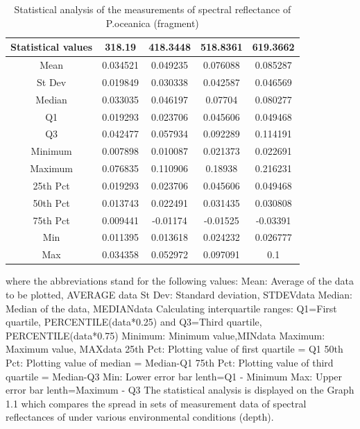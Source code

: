 \documentclass[10pt, a4paper]{article}
\begin{document}
\begin{table}
\caption{Statistical analysis of the measurements of spectral reflectance of P.oceanica (fragment)}
\centering
  \begin{tabular}{| c | c | c | c | c |}
    \hline
   	 \textbf{Statistical values} & \textbf{318.19} & \textbf{418.3448} & \textbf{518.8361} & \textbf{619.3662} \\ \hline \hline
	    Mean & 0.034521 & 0.049235 & 0.076088 & 0.085287 \\ \hline
	    St Dev & 0.019849 & 0.030338 & 0.042587 & 0.046569 \\ \hline
	   Median & 0.033035 & 0.046197 & 0.07704 & 0.080277 \\ \hline
	   Q1 & 0.019293 & 0.023706 & 0.045606& 0.049468 \\ \hline
	   Q3 & 0.042477 & 0.057934 & 0.092289 & 0.114191 \\ \hline
	   Minimum & 0.007898 & 0.010087 & 0.021373 & 0.022691 \\ \hline
	   Maximum & 0.076835 & 0.110906 & 0.18938 & 0.216231 \\ \hline
	   25th Pct & 0.019293 & 0.023706 & 0.045606 & 0.049468 \\ \hline
	   50th Pct & 0.013743 & 0.022491 & 0.031435 & 0.030808 \\ \hline
	   75th Pct & 0.009441 & -0.01174 & -0.01525 & -0.03391 \\ \hline
	   Min & 0.011395 & 0.013618 & 0.024232 & 0.026777 \\ \hline
	   Max & 0.034358 & 0.052972 & 0.097091 & 0.1 \\ \hline
  \end{tabular}
   \label{tab:4}
\end{table}

where the abbreviations stand for the following values:
Mean: Average of the data to be plotted, AVERAGE {data}
St Dev: Standard deviation, STDEV{data}
Median: Median of the data, MEDIAN{data}
Calculating interquartile ranges: Q1=First quartile, PERCENTILE({data}*0.25) and Q3=Third
quartile, PERCENTILE({data}*0.75)
Minimum: Minimum value,MIN{data}
Maximum: Maximum value, MAX{data}
25th Pct: Plotting value of first quartile = Q1
50th Pct: Plotting value of median = Median-Q1
75th Pct: Plotting value of third quartile = Median-Q3
Min: Lower error bar lenth=Q1 - Minimum
Max: Upper error bar lenth=Maximum - Q3
The statistical analysis is displayed on the Graph 1.1 which compares the spread in sets of
measurement data of spectral reflectances of under various environmental conditions (depth).
\end{document}
